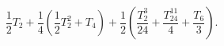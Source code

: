 \begin{equation}
        \frac{1}{2}T_2
    +\frac{1}{4}
    \left(
    \frac{1}{2}T^2_2
        +T_4
    \right)
    +\frac{1}{2}
    \left(
    \frac{T^3_2}{24}+\frac{T^{11}_{24}}{4}+\frac{T_6}{3}
    \right).
\end{equation}

